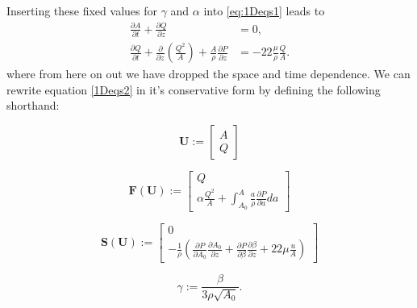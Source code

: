 \documentclass[a4paper, oneside]{discothesis}
\begin{document}
Inserting these fixed values for $\gamma$ and $\alpha$ into  \autoref{eq:1Deqs1} leads to 
\begin{equation}
	\begin{aligned} 
		\frac{\partial A}{\partial t} + \frac{\partial Q}{\partial z} &= 0, \\ 
		\frac{\partial Q}{\partial t} + \frac{\partial}{\partial z}\left(\frac{Q^2}{A} \right) + \frac{A}{\rho} \frac{\partial P}{\partial z} &= -22 \frac{\mu}{\rho} \frac{Q}{A}.
	\end{aligned} \label{1Deqs2}
\end{equation}
where from here on out we have dropped the space and time dependence.
We can rewrite equation \ref{1Deqs2} in it's conservative form by defining the following shorthand:

\begin{equation}
	\mathbf{U} := 
	\begin{bmatrix}
		A \\
		Q
	\end{bmatrix}
\end{equation}

\begin{equation}
	\mathbf{F} \left( \mathbf{U} \right) := 
	\begin{bmatrix}
		Q \\
		\alpha \frac{Q^2}{A} + \int_{A_0}^{A} \frac{a}{\rho}\frac{\partial P}{\partial a} da
	\end{bmatrix}
\end{equation}

\begin{equation}
	\mathbf{S} \left( \mathbf{U} \right) := 
	\begin{bmatrix}
		0 \\
		-\frac{1}{\rho} \left( \frac{\partial P}{\partial A_0} \frac{\partial A_0}{\partial z} + \frac{\partial P}{\partial \beta} \frac{\partial \beta}{\partial z} + 22\mu\frac{u}{A} \right)
	\end{bmatrix}
\end{equation}

\begin{equation}
	\gamma := \frac{\beta}{3\rho\sqrt{A_0}}.
\end{equation}
\end{document}
